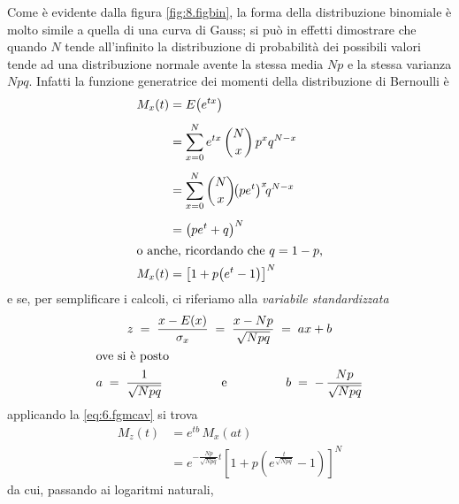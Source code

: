 %
Come \`e evidente dalla figura \ref{fig:8.figbin}, la forma
della distribuzione binomiale \`e molto simile a quella di
una curva di Gauss; si pu\`o in effetti dimostrare che
quando $N$ tende all'infinito la distribuzione di
probabilit\`a dei possibili valori tende ad una
distribuzione normale avente la stessa media $Np$ e la
stessa varianza $Npq$.  Infatti la funzione generatrice dei
momenti della distribuzione di Bernoulli \`e
\begin{align*}
  M_x(t) &= E \bigl( e^{tx} \bigr) \\[1ex]
  &= \sum_{x=0}^N e^{tx} \, \binom{N}{x} \, p^x q^{N-x}
    \\[1ex]
  &= \sum_{x=0}^N \binom{N}{x} \! \bigl( p e^t
    \bigr)^x \! q^{N-x} \\[1ex]
  &= \bigl( p e^t + q \bigr)^N \\
  \intertext{o anche, ricordando che $q=1-p$,}
  M_x(t) &= \left[ 1 + p \bigl( e^t - 1 \bigr)
    \right]^N
\end{align*}
e se, per semplificare i calcoli, ci riferiamo alla
\emph{variabile standardizzata}
\begin{gather*}
  z \; = \; \frac{x - E(x)}{\sigma_x} \; = \; \frac{x -
    Np}{\sqrt{Npq}} \; = \; ax+b \\
  \intertext{ove si \`e posto}
  a \; = \; \frac{1}{\sqrt{Npq}} \makebox[35mm]{e} b \;
    = \; - \, \frac{Np}{\sqrt{Npq}} \\
\end{gather*}
applicando la \eqref{eq:6.fgmcav} si trova
\begin{align*}
  M_z(t) &= e^{tb} \, M_x(at) \\[1ex]
  &= e^{- \frac{Np}{\sqrt{Npq}} t} \left[ 1 + p
    \left( e^{\frac{t}{\sqrt{Npq}}} - 1 \right)
    \right]^N
\end{align*}
da cui, passando ai logaritmi naturali,

